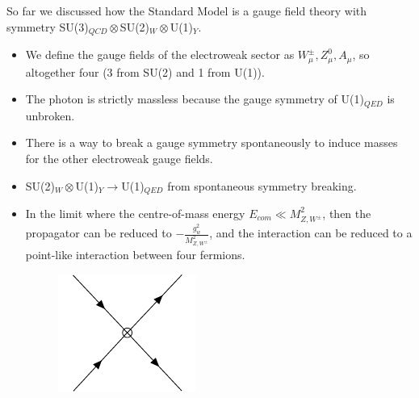 \documentclass[relqm.tex]{subfiles}
\begin{document}
\chapter{}
    So far we discussed how the Standard Model is a gauge field theory with symmetry SU(3)$_{QCD}\otimes$SU(2)$_W\otimes$U(1)$_{Y}$.
\begin{itemize}
    \item We define the gauge fields of the electroweak sector as $W^\pm_\mu,Z_\mu^0,A_\mu$, so altogether four (3 from SU(2) and 1 from U(1)).
    \item The photon is strictly massless because the gauge symmetry of U(1)$_{QED}$ is unbroken. 
    \item There is a way to break a gauge symmetry spontaneously to induce masses for the other electroweak gauge fields. 
    \item SU(2)$_W\otimes$U(1)$_Y\to$U(1)$_{QED}$ from spontaneous symmetry breaking.  
    \item In the limit where the centre-of-mass energy $E_{com}\ll M_{Z,W^{\pm}}^2$, then the propagator can be reduced to $-\frac{g_{w}^2}{M_{Z,W^{\pm}}^2}$, and the interaction can be reduced to a point-like interaction between four fermions. 
        \begin{figure}[H]
            \centering
            \includegraphics[scale=0.8]{diagrams/fermi.pdf}
        \end{figure}
\end{itemize}
\end{document}
